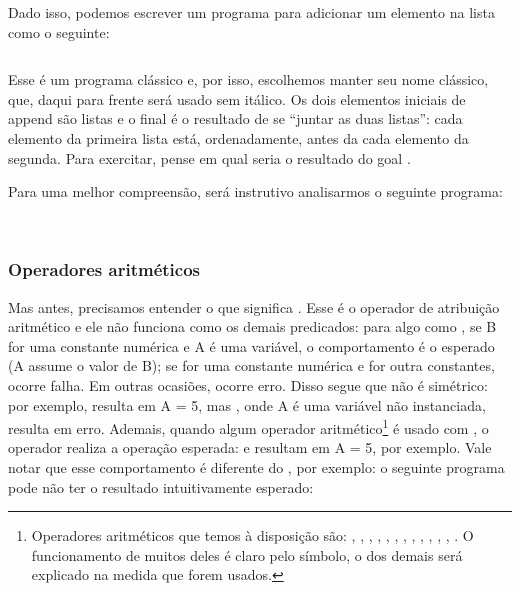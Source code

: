 Dado isso, podemos escrever um programa para adicionar um elemento na lista como o seguinte:

\begin{listing}[ht]
    \begin{listing}
\inputminted{prolog}{../Exemplos/Cap2/prog2_append.pl}\label{lst:append}
    \end{listing}
\end{listing}

Esse é um programa clássico e, por isso, escolhemos manter seu nome clássico, que, daqui para frente será usado sem itálico. Os dois elementos iniciais de append são listas e o final é o resultado de se ``juntar as duas listas'': cada elemento da primeira lista está, ordenadamente, antes da cada elemento da segunda. Para exercitar, pense em qual seria o resultado do goal .

Para uma melhor compreensão, será instrutivo analisarmos o seguinte programa:
\\
\\

    \begin{listing}
\inputminted{prolog}{../Exemplos/Cap3/prog2_length.pl}\label{lst:length}
    \end{listing}

\subsubsection{Operadores aritméticos}

Mas antes, precisamos entender o que significa . Esse  é o operador de atribuição aritmético e ele não funciona como os demais predicados: para algo como , se B for uma constante numérica e A é uma variável, o comportamento é o esperado (A assume o valor de B); se  for uma constante numérica e  for outra constantes, ocorre falha. Em outras ocasiões, ocorre erro.
Disso segue que  não é simétrico: por exemplo,  resulta em A = 5, mas ,
onde A é uma variável não instanciada, resulta em erro. Ademais, quando algum
operador aritmético\footnote{Operadores aritméticos que temos à disposição são: ,
  , , , , , ,
  , , , , , . O
  funcionamento de muitos deles é claro pelo símbolo, o dos demais será explicado na medida que
  forem usados.}  é usado com , o operador realiza a operação esperada:
 e  resultam em A = 5, por exemplo. Vale notar que esse
comportamento é diferente do , por exemplo: o seguinte
programa pode não ter o resultado intuitivamente esperado:


